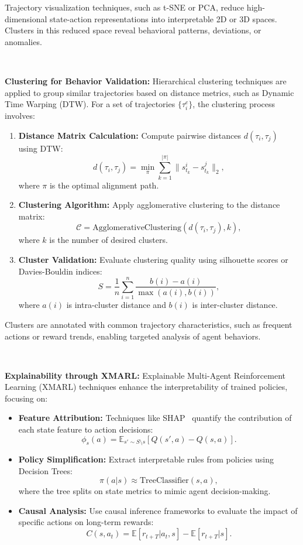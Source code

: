 \documentclass[conference]{IEEEtran}
\begin{document}
Trajectory visualization techniques, such as t-SNE or PCA, reduce high-dimensional state-action representations into interpretable 2D or 3D spaces. Clusters in this reduced space reveal behavioral patterns, deviations, or anomalies.

\

\noindent\textbf{Clustering for Behavior Validation:}
Hierarchical clustering techniques are applied to group similar trajectories based on distance metrics, such as Dynamic Time Warping (DTW). For a set of trajectories $\{\tau_i^e\}$, the clustering process involves:
\begin{enumerate}
    \item \textbf{Distance Matrix Calculation:} Compute pairwise distances $d(\tau_i, \tau_j)$ using DTW:
    \[
    d(\tau_i, \tau_j) = \min_{\pi} \sum_{k=1}^{|\pi|} \|s_{t_k}^i - s_{t_k}^j\|_2,
    \]
    where $\pi$ is the optimal alignment path.
    \item \textbf{Clustering Algorithm:} Apply agglomerative clustering to the distance matrix:
    \[
    \mathcal{C} = \text{AgglomerativeClustering}(d(\tau_i, \tau_j), k),
    \]
    where $k$ is the number of desired clusters.
    \item \textbf{Cluster Validation:} Evaluate clustering quality using silhouette scores or Davies-Bouldin indices:
    \[
    S = \frac{1}{n} \sum_{i=1}^n \frac{b(i) - a(i)}{\max(a(i), b(i))},
    \]
    where $a(i)$ is intra-cluster distance and $b(i)$ is inter-cluster distance.
\end{enumerate}

Clusters are annotated with common trajectory characteristics, such as frequent actions or reward trends, enabling targeted analysis of agent behaviors.

\

\noindent\textbf{Explainability through XMARL:}
Explainable Multi-Agent Reinforcement Learning (XMARL) techniques enhance the interpretability of trained policies, focusing on:
\begin{itemize}
    \item \textbf{Feature Attribution:} Techniques like SHAP~\cite{SHAP2020} quantify the contribution of each state feature to action decisions:
    \[
    \phi_{s}(a) = \mathbb{E}_{s' \sim S \setminus s} \left[ Q(s', a) - Q(s, a) \right].
    \]
    \item \textbf{Policy Simplification:} Extract interpretable rules from policies using Decision Trees:
    \[
    \pi(a|s) \approx \text{TreeClassifier}(s, a),
    \]
    where the tree splits on state metrics to mimic agent decision-making.
    \item \textbf{Causal Analysis:} Use causal inference frameworks to evaluate the impact of specific actions on long-term rewards:
    \[
    C(s, a_t) = \mathbb{E}[r_{t+T}|a_t, s] - \mathbb{E}[r_{t+T}|s].
    \]
\end{itemize}
\end{document}

